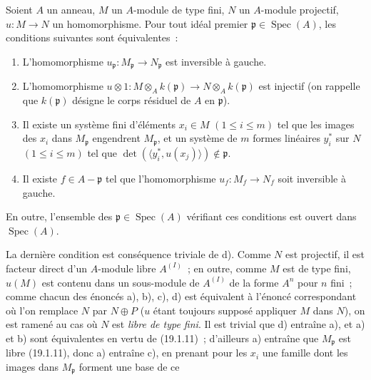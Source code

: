 \begin{corollary}[19.1.12]
\label{0.19.1.12-fr}
Soient $A$ un anneau, $M$ un $A$-module de type fini, $N$ un $A$-module
projectif, $u:M\to N$ un homomorphisme. Pour tout idéal premier
$\mathfrak p\in\operatorname{Spec}(A)$, les conditions suivantes sont
équivalentes~:
\begin{enumerate}
  \item[a)] L'homomorphisme
  $u_{\mathfrak p}:M_{\mathfrak p}\to N_{\mathfrak p}$ est inversible à
  gauche.
  \item[b)] L'homomorphisme
  $u\otimes1:M\otimes_Ak(\mathfrak p)\to N\otimes_Ak(\mathfrak p)$ est
  injectif (on rappelle que $k(\mathfrak p)$ désigne le corps résiduel de $A$
  en $\mathfrak p$).
  \item[c)] Il existe un système fini d'éléments $x_i\in M$
  $(1\leq i\leq m)$ tel que les images des $x_i$ dans $M_{\mathfrak p}$
  engendrent $M_{\mathfrak p}$, et un système de $m$ formes linéaires
  $y_i^*$ sur $N$ $(1\leq i\leq m)$ tel que
  $\det(\langle y_i^*,u(x_j)\rangle)\notin\mathfrak p$.
  \item[d)] Il existe $f\in A-\mathfrak p$ tel que l'homomorphisme
  $u_f:M_f\to N_f$ soit inversible à gauche.
\end{enumerate}
En outre, l'ensemble des $\mathfrak p\in\operatorname{Spec}(A)$ vérifiant ces
conditions est ouvert dans $\operatorname{Spec}(A)$.
\end{corollary}

La dernière condition est conséquence triviale de d). Comme $N$ est
projectif, il est facteur direct d'un $A$-module libre $A^{(I)}$~; en outre,
comme $M$ est de type fini, $u(M)$ est contenu dans un sous-module de $A^{(I)}$
de la forme $A^n$ pour $n$ fini~; comme chacun des énoncés a), b), c), d) est
équivalent à l'énoncé correspondant où l'on remplace $N$ par $N\oplus P$ ($u$
étant toujours supposé appliquer $M$ dans $N$), on est ramené au cas où $N$
est \emph{libre de type fini}. Il est trivial que d) entraîne a), et a) et b)
sont équivalentes en vertu de (19.1.11)~; d'ailleurs a) entraîne que
$M_{\mathfrak p}$ est libre (19.1.11), donc a) entraîne c), en prenant pour les
$x_i$ une famille dont les images dans $M_{\mathfrak p}$ forment une base de ce


